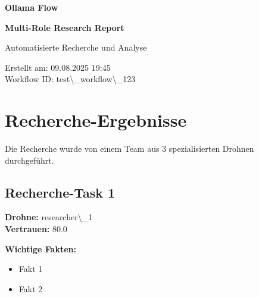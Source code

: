 \documentclass[12pt,a4paper]{article}
\begin{document}
\begin{titlepage}
    \centering
    
    \vspace*{2cm}
    
    {\Huge\bfseries Ollama Flow}
    
    {\Huge\bfseries Multi-Role Research Report}
    
    \vspace{2cm}
    
    {\Large Automatisierte Recherche und Analyse}
    
    \vspace{3cm}
    
    
    \vspace{2cm}
    
    
    \vfill
    
    {\large
    Erstellt am: 09.08.2025 19:45\\
    Workflow ID: test\textbackslash{}_workflow\textbackslash{}_123
    }
    
\end{titlepage}

\newpage
\tableofcontents
\newpage

\section{Recherche-Ergebnisse}

Die Recherche wurde von einem Team aus 3 spezialisierten Drohnen durchgeführt.

\subsection{Recherche-Task 1}

\textbf{Drohne:} researcher\textbackslash{}_1\\
\textbf{Vertrauen:} 80.0%

\textbf{Wichtige Fakten:}
\begin{itemize}
\item Fakt 1
\item Fakt 2
\end{itemize}
\end{document}
